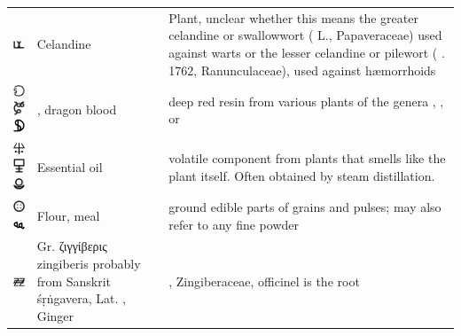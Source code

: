 \documentclass[british,final,landscape]{scrartcl}
\begin{document}
\begin{refsection}
\begin{supertabular}{p{0.3\textwidth}p{0.34\textwidth}p{0.34\textwidth}}
   \includegraphics[width=5mm]{Plant/Celandine} & Celandine & Plant, unclear whether this means the greater celandine or swallowwort ( L., Papaveraceae) used against warts or the lesser celandine or pilewort ( . 1762, Ranunculaceae), used against hæmorrhoids \\
   \includegraphics[width=5mm]{Plant/DragonBlood}\includegraphics[width=5mm]{Plant/DragonBlood2}  \includegraphics[width=5mm]{Plant/DragonBlood3} & , dragon blood & deep red resin from various plants of the genera , ,  or  \\
   \includegraphics[width=5mm]{Plant/EthericOil} \includegraphics[width=5mm]{Plant/EthericOil2} \includegraphics[width=5mm]{Plant/EthericOil3} & Essential oil & volatile component from plants that smells like the plant itself. Often obtained by steam distillation. \\
   \includegraphics[width=5mm]{Plant/Flour} \includegraphics[width=5mm]{Plant/Flour2} & Flour, meal & ground edible parts of grains and pulses; may also refer to any fine powder \\
   \includegraphics[width=5mm]{Plant/Ginger}& Gr. \foreignlanguage{greek}{ζιγγίβερις} zingiberis probably from Sanskrit śṛṅgavera, Lat. , Ginger &  , Zingiberaceae, officinel is the root  \\

\end{supertabular}
\end{refsection}
\end{document}
